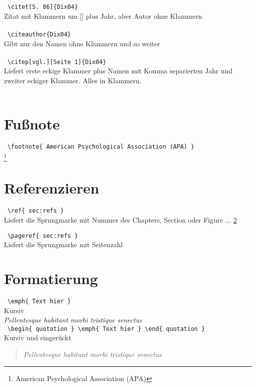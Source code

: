     \texttt{ \textbackslash citet[S. 86]\{Dix04\} } \\
    Zitat mit Klammern um [] plus Jahr, aber Autor ohne Klammern \\
    \citet[S. 86]{Dix04} \\

    \texttt{ \textbackslash citeauthor\{Dix04\} } \\
    Gibt nur den Namen ohne Klammern und so weiter \\
    \citeauthor{Dix04} \\
    
    \texttt{ \textbackslash citep[vgl.][Seite 1]\{Dix04\} } \\
    Liefert erste eckige Klammer plus Namen mit Komma separierten Jahr und zweiter eckiger Klammer. Alles in Klammern. \\
    \citep[vgl.][Seite 1]{Dix04} \\

\section{Fußnote} \label{sec:notes}
    \texttt{ \textbackslash footnote\{ American Psychological Association (APA) \} } \\
    \footnote{ American Psychological Association (APA) }

\section{Referenzieren} \label{sec:refs}
    \texttt{ \textbackslash ref\{ sec:refs \} } \\
    Liefert die Sprungmarke mit Nummer des Chapters, Section oder Figure ...
    \ref{sec:refs}

    \texttt{ \textbackslash pageref\{ sec:refs \} } \\
    Liefert die Sprungmarke mit Seitenzahl
    \pageref{sec:marks}

\section{Formatierung} \label{sec:format}
    \texttt{ \textbackslash emph\{ Text hier \} } \\
    Kursiv \\
    \emph{Pellentesque habitant morbi tristique senectus} \\

    \texttt{ 
    \textbackslash begin\{ quotation \}
        \textbackslash emph\{ Text hier \}
    \textbackslash end\{ quotation \}
    } \\
    Kursiv und eingerückt \\
    \begin{quotation}
        \emph{Pellentesque habitant morbi tristique senectus}
    \end{quotation} 

